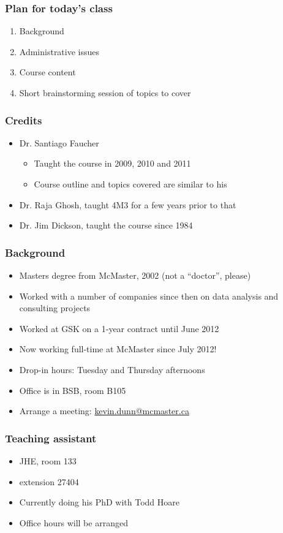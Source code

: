 
\begin{frame}\frametitle{Plan for today's class}
	\begin{enumerate}
		\item	Background
		\item	Administrative issues
		\item	Course content
		\item	Short brainstorming session of topics to cover
	\end{enumerate}
\end{frame}

\begin{frame}\frametitle{Credits}
	
	\begin{itemize}
		\item	Dr. Santiago Faucher
		\begin{itemize}
			\item	Taught the course in 2009, 2010 and 2011
			\item	Course outline and topics covered are similar to his
		\end{itemize}
		\item	Dr. Raja Ghosh, taught 4M3 for a few years prior to that
		\item	Dr. Jim Dickson, taught the course since 1984
	\end{itemize}	
\end{frame}

\begin{frame}\frametitle{Background}
	\begin{itemize}
		\item	Masters degree from McMaster, 2002 (not a ``doctor'', please)
		\item	Worked with a number of companies since then on data analysis and consulting projects
		\item	Worked at GSK on a 1-year contract until June 2012		
		\item	Now working full-time at McMaster since July 2012!
		\item	Drop-in hours: Tuesday and Thursday afternoons
		\item	Office is in BSB, room B105
		\item	Arrange a meeting: \url{kevin.dunn@mcmaster.ca}
	\end{itemize}	
\end{frame}

\begin{frame}\frametitle{Teaching assistant}
	{\color{myGreen}{Daryl Sivakumaran}}
	\begin{itemize}
		\item	JHE, room 133
		\item	extension 27404
		\item	Currently doing his PhD with Todd Hoare
		\item	Office hours will be arranged
	\end{itemize}
\end{frame}

